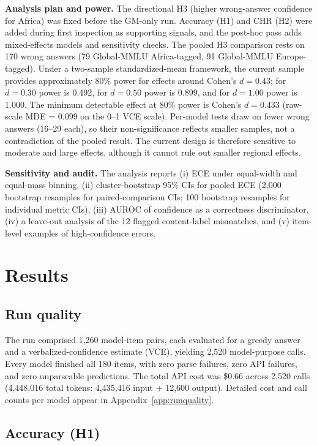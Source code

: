 \documentclass[11pt]{article}
\begin{document}
\textbf{Analysis plan and power.} The directional H3 (higher wrong-answer confidence for Africa) was fixed before the GM-only run. Accuracy (H1) and CHR (H2) were added during first inspection as supporting signals, and the post-hoc pass adds mixed-effects models and sensitivity checks. The pooled H3 comparison rests on 170 wrong answers (79 Global-MMLU Africa-tagged, 91 Global-MMLU Europe-tagged). Under a two-sample standardized-mean framework, the current sample provides approximately 80\% power for effects around Cohen's $d = 0.43$; for $d = 0.30$ power is 0.492, for $d = 0.50$ power is 0.899, and for $d = 1.00$ power is 1.000. The minimum detectable effect at 80\% power is Cohen's $d = 0.433$ (raw-scale MDE = 0.099 on the 0--1 VCE scale). Per-model tests draw on fewer wrong answers (16--29 each), so their non-significance reflects smaller samples, not a contradiction of the pooled result. The current design is therefore sensitive to moderate and large effects, although it cannot rule out smaller regional effects.

\textbf{Sensitivity and audit.} The analysis reports (i) ECE under equal-width and equal-mass binning, (ii) cluster-bootstrap 95\% CIs for pooled ECE (2,000 bootstrap resamples for paired-comparison CIs; 100 bootstrap resamples for individual metric CIs), (iii) AUROC of confidence as a correctness discriminator, (iv) a leave-out analysis of the 12 flagged content-label mismatches, and (v) item-level examples of high-confidence errors.

\section{Results}
\label{sec:results}

\subsection{Run quality}

The run comprised 1,260 model-item pairs, each evaluated for a greedy answer and a verbalized-confidence estimate (VCE), yielding 2,520 model-purpose calls. Every model finished all 180 items, with zero parse failures, zero API failures, and zero unparseable predictions. The total API cost was \$0.66 across 2,520 calls (4,448,016 total tokens: 4,435,416 input + 12,600 output). Detailed cost and call counts per model appear in Appendix~\ref{app:runquality}.

\subsection{Accuracy (H1)}
\end{document}
